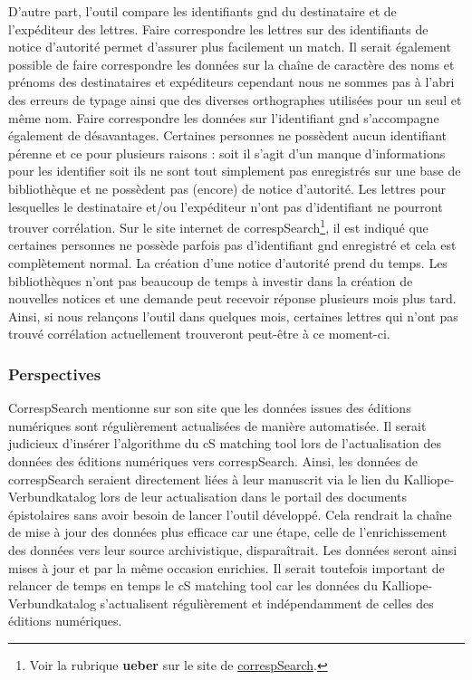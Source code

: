 \documentclass[a4paper, 12pt, twoside]{book}
\begin{document}
D'autre part, l'outil compare les identifiants \gls{gnd} du destinataire et de l'expéditeur des lettres. Faire correspondre les lettres sur des identifiants de notice d'autorité permet d'assurer plus facilement un match. Il serait également possible de faire correspondre les données sur la chaîne de caractère des noms et prénoms des destinataires et expéditeurs cependant nous ne sommes pas à l'abri des erreurs de typage ainsi que des diverses orthographes utilisées pour un seul et même nom. Faire correspondre les données sur l'identifiant \gls{gnd} s'accompagne également de désavantages. Certaines personnes ne possèdent aucun identifiant pérenne et ce pour plusieurs raisons : soit il s'agit d'un manque d'informations pour les identifier soit ils ne sont tout simplement pas enregistrés sur une base de bibliothèque et ne possèdent pas (encore) de notice d'autorité. Les lettres pour lesquelles le destinataire et/ou l'expéditeur n'ont pas d'identifiant ne pourront trouver corrélation. Sur le site internet de correspSearch\footnote{Voir la rubrique \textbf{ueber} sur le site de \href{https://correspsearch.net/de/ueber.html}{correspSearch}.}, il est indiqué que certaines personnes ne possède parfois pas d'identifiant \gls{gnd} enregistré et cela est complètement normal. La création d'une notice d'autorité prend du temps. Les bibliothèques n'ont pas beaucoup de temps à investir dans la création de nouvelles notices et une demande peut recevoir réponse plusieurs mois plus tard. Ainsi, si nous relançons l'outil dans quelques mois, certaines lettres qui n'ont pas trouvé corrélation actuellement trouveront peut-être à ce moment-ci.

\subsubsection{Perspectives}
CorrespSearch mentionne sur son site que les données issues des éditions numériques sont régulièrement actualisées de manière automatisée. Il serait judicieux d'insérer l'algorithme du cS matching tool lors de l'actualisation des données des éditions numériques vers correspSearch. Ainsi, les données de correspSearch seraient directement liées à leur manuscrit via le lien du Kalliope-Verbundkatalog lors de leur actualisation dans le portail des documents épistolaires sans avoir besoin de lancer l'outil développé. Cela rendrait la chaîne de mise à jour des données plus efficace car une étape, celle de l'enrichissement des données vers leur source archivistique, disparaîtrait. Les données seront ainsi mises à jour et par la même occasion enrichies. Il serait toutefois important de relancer de temps en temps le cS matching tool car les données du Kalliope-Verbundkatalog s'actualisent régulièrement et indépendamment de celles des éditions numériques. 
\end{document}
